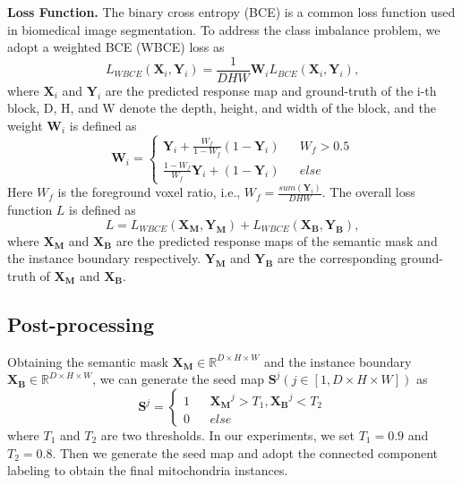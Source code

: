 \documentclass{article}
\begin{document}
\textbf{Loss Function.} 
The binary cross entropy (BCE) is a common loss function used in biomedical image segmentation. To address the class imbalance problem, we adopt a weighted BCE (WBCE) loss as
\begin{equation}
L_{WBCE}(\bm{X}_i, \bm{Y}_i) = \frac{1}{DHW} \bm{W}_i L_{BCE}(\bm{X}_i, \bm{Y}_i), 
\end{equation}
where $\bm{X}_i$ and $\bm{Y}_i$ are the predicted response map and ground-truth of the i-th block, D, H, and W denote the depth, height, and width of the block, and the weight $\bm{W}_i$ is defined as
\begin{equation}
\bm{W}_i =\left\{
\begin{array}{rcl}
\bm{Y}_i + \frac{W_f}{1-W_f} (1-\bm{Y}_i)      &      & W_f > 0.5\\
\frac{1-W_f}{W_f} \bm{Y}_i + (1-\bm{Y}_i)       &      & else
\end{array} \right. 
\end{equation}
Here $W_f$ is the foreground voxel ratio, i.e., $W_f=\frac {sum(\bm{Y}_i)} {DHW}$. 
The overall loss function $L$ is defined as 
\begin{equation}
L = L_{WBCE}(\bm{X_M}, \bm{Y_M}) + L_{WBCE}(\bm{X_B}, \bm{Y_B}),
\end{equation}
where $\bm{X_M}$ and $\bm{X_B}$ are the predicted response maps of the semantic mask and the instance boundary respectively. $\bm{Y_M}$ and $\bm{Y_B}$ are the corresponding ground-truth of $\bm{X_M}$ and $\bm{X_B}$.


\subsection{Post-processing}
Obtaining the semantic mask $\bm{X_M} \in \mathbb{R}^{D\times H \times W}$ and the instance boundary $\bm{X_B} \in \mathbb{R}^{D\times H \times W}$, we can generate the seed map $\bm{S}^j ( j\in[1, D\times H \times W])$ as 
\begin{equation}
\bm{S}^j =\left\{
    \begin{array}{rcl}
    1      &      & \bm{X_M}^j > T_1, \bm{X_B}^j < T_2 \\
    0       &      & else
    \end{array} \right. 
   \label{eq:affinity}
\end{equation}
where $T_1$ and $T_2$ are two thresholds. In our experiments, we set $T_1 = 0.9$ and $T_2 = 0.8$. Then we generate the seed map and adopt the connected component labeling   to obtain the final mitochondria instances.
\end{document}

